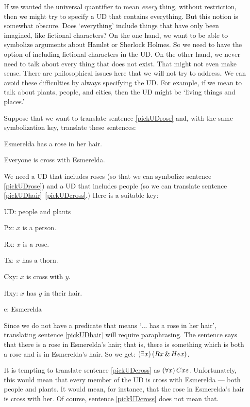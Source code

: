 If we wanted the universal quantifier to mean \emph{every} thing, without restriction, then we might try to specify a UD that contains everything. But this notion is somewhat obscure. Does `everything' include things that have only been imagined, like fictional characters? On the one hand, we want to be able to symbolize arguments about Hamlet or Sherlock Holmes. So we need to have the option of including fictional characters in the UD. On the other hand, we never need to talk about every thing that does not exist. That might not even make sense. There are philosophical issues here that we will not try to address. We can avoid these difficulties by always specifying the UD. For example, if we mean to talk about plants, people, and cities, then the UD might be `living things and places.'

Suppose that we want to translate sentence \ref{pickUDrose} and, with the same symbolization key, translate these sentences:

\begin{earg}
\item[\ex{pickUDhair}] Esmerelda has a rose in her hair.
\item[\ex{pickUDcross}] Everyone is cross with Esmerelda.
\end{earg}

We need a UD that includes roses (so that we can symbolize sentence \ref{pickUDrose}) and a UD that includes people (so we can translate sentence \ref{pickUDhair}--\ref{pickUDcross}.) Here is a suitable key:
\begin{ekey}
\item[UD:] people and plants
\item[Px:] $x$ is a person.
\item[Rx:] $x$ is a rose.
\item[Tx:] $x$ has a thorn.
\item[Cxy:] $x$ is cross with $y$.
\item[Hxy:] $x$ has $y$ in their hair.
\item[e:] Esmerelda
\end{ekey}

Since we do not have a predicate that means `$\ldots$ has a rose in her hair', translating sentence \ref{pickUDhair} will require paraphrasing. The sentence says that there is a rose in Esmerelda's hair; that is, there is something which is both a rose and is in Esmerelda's hair. So we get: $(\exists x) \,(Rx \,\&\, Hex)$.

It is tempting to translate sentence \ref{pickUDcross} as $(\forall x) \, Cxe$. Unfortunately, this would mean that every member of the UD is cross with Esmerelda --- both people and plants. It would mean, for instance, that the rose in Esmerelda's hair is cross with her. Of course, sentence \ref{pickUDcross} does not mean that.

